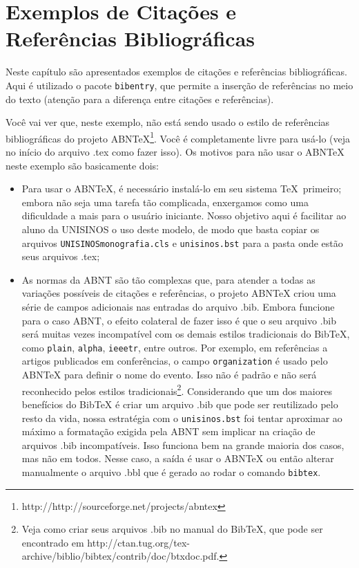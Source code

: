 \documentclass[twoside,english,brazilian]{UNISINOSmonografia}
\begin{document}
\chapter{Exemplos de Citações e Referências Bibliográficas}
\nobibliography* %
Neste capítulo são apresentados exemplos de citações e referências bibliográficas.  Aqui é utilizado o pacote \texttt{bibentry}, que permite a inserção de referências no meio do texto (atenção para a diferença entre citações e referências).

Você vai ver que, neste exemplo, não está sendo usado o estilo de referências bibliográficas do projeto ABNTeX\footnote{http://http://sourceforge.net/projects/abntex}.  Você é completamente livre para usá-lo (veja no início do arquivo .tex como fazer isso).  Os motivos para não usar o ABNTeX neste exemplo são basicamente dois:
\begin{itemize}
	\item Para usar o ABNTeX, é necessário instalá-lo em seu sistema \TeX\ primeiro; embora não seja uma tarefa tão complicada, enxergamos como uma dificuldade a mais para o usuário iniciante.  Nosso objetivo aqui é facilitar ao aluno da UNISINOS o uso deste modelo, de modo que basta copiar os arquivos \texttt{UNISINOSmonografia.cls} e \texttt{unisinos.bst} para a pasta onde estão seus arquivos .tex;
	\item As normas da ABNT são tão complexas que, para atender a todas as variações possíveis de citações e referências, o projeto ABNTeX criou uma série de campos adicionais nas entradas do arquivo .bib.  Embora funcione para o caso ABNT, o efeito colateral de fazer isso é que o seu arquivo .bib será muitas vezes incompatível com os demais estilos tradicionais do BibTeX, como \texttt{plain}, \texttt{alpha}, \texttt{ieeetr}, entre outros.  Por exemplo, em referências a artigos publicados em conferências, o campo \texttt{organization} é usado pelo ABNTeX para definir o nome do evento.  Isso não é padrão e não será reconhecido pelos estilos tradicionais\footnote{Veja como criar seus arquivos .bib no manual do BibTeX, que pode ser encontrado em http://ctan.tug.org/tex-archive/biblio/bibtex/contrib/doc/btxdoc.pdf.}.  Considerando que um dos maiores benefícios do BibTeX é criar um arquivo .bib que pode ser reutilizado pelo resto da vida, nossa estratégia com o \texttt{unisinos.bst} foi tentar aproximar ao máximo a formatação exigida pela ABNT sem implicar na criação de arquivos .bib incompatíveis.  Isso funciona bem na grande maioria dos casos, mas não em todos.  Nesse caso, a saída é usar o ABNTeX ou então alterar manualmente o arquivo .bbl que é gerado ao rodar o comando \texttt{bibtex}.
\end{itemize}
\end{document}
